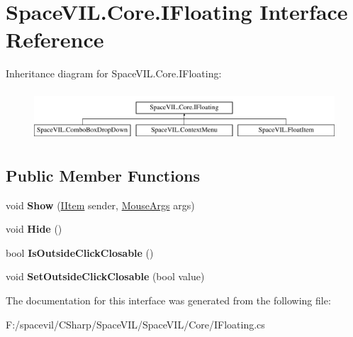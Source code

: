\hypertarget{interface_space_v_i_l_1_1_core_1_1_i_floating}{}\section{Space\+V\+I\+L.\+Core.\+I\+Floating Interface Reference}
\label{interface_space_v_i_l_1_1_core_1_1_i_floating}
Inheritance diagram for Space\+V\+I\+L.\+Core.\+I\+Floating\+:\begin{figure}[H]
\begin{center}
\leavevmode
\includegraphics[height=1.876047cm]{interface_space_v_i_l_1_1_core_1_1_i_floating}
\end{center}
\end{figure}
\subsection*{Public Member Functions}
\begin{DoxyCompactItemize}
\item 
\mbox{\label{interface_space_v_i_l_1_1_core_1_1_i_floating_a71315141109b37b0112fc9da3daa8078}} 
void {\bfseries Show} (\mbox{\hyperlink{interface_space_v_i_l_1_1_core_1_1_i_item}{I\+Item}} sender, \mbox{\hyperlink{class_space_v_i_l_1_1_core_1_1_mouse_args}{Mouse\+Args}} args)
\item 
\mbox{\label{interface_space_v_i_l_1_1_core_1_1_i_floating_acab7554a70314060a948d87259d2f6d5}} 
void {\bfseries Hide} ()
\item 
\mbox{\label{interface_space_v_i_l_1_1_core_1_1_i_floating_a8d016f661d0688f4f46334e4e8a8f286}} 
bool {\bfseries Is\+Outside\+Click\+Closable} ()
\item 
\mbox{\label{interface_space_v_i_l_1_1_core_1_1_i_floating_a9c7e51e01c96a82e7f5825986382b017}} 
void {\bfseries Set\+Outside\+Click\+Closable} (bool value)
\end{DoxyCompactItemize}


The documentation for this interface was generated from the following file\+:\begin{DoxyCompactItemize}
\item 
F\+:/spacevil/\+C\+Sharp/\+Space\+V\+I\+L/\+Space\+V\+I\+L/\+Core/I\+Floating.\+cs\end{DoxyCompactItemize}
